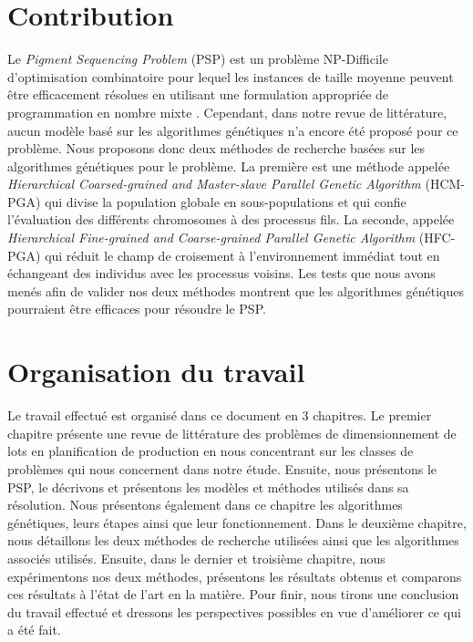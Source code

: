 	\section*{Contribution}
	Le \emph{Pigment Sequencing Problem} (PSP) est un problème NP-Difficile d'optimisation combinatoire pour lequel les instances de taille moyenne peuvent être efficacement résolues en utilisant une formulation appropriée de programmation en nombre mixte \cite{pochet_wolsey}. Cependant, dans notre revue de littérature, aucun modèle basé sur les algorithmes génétiques n'a encore été proposé pour ce problème. Nous proposons donc deux méthodes de recherche basées sur les algorithmes génétiques pour le problème. La première est une méthode appelée \emph{Hierarchical Coarsed-grained and Master-slave Parallel Genetic Algorithm} (HCM-PGA) qui divise la population globale en sous-populations et qui confie l'évaluation des différents chromosomes à des processus fils. La seconde, appelée \emph{Hierarchical Fine-grained and Coarse-grained Parallel Genetic Algorithm} (HFC-PGA) qui réduit le champ de croisement à l'environnement immédiat tout en échangeant des individus avec les processus voisins. Les tests que nous avons menés afin de valider nos deux méthodes montrent que les algorithmes génétiques pourraient être efficaces pour résoudre le PSP. 
	 
	\section*{Organisation du travail}

	Le travail effectué est organisé dans ce document en 3 chapitres. Le premier chapitre présente une revue de littérature des problèmes de dimensionnement de lots en planification de production en nous concentrant sur les classes de problèmes qui nous concernent dans notre étude. Ensuite, nous présentons le PSP, le décrivons et présentons les modèles et méthodes utilisés dans sa résolution. Nous présentons également dans ce chapitre les algorithmes génétiques, leurs étapes ainsi que leur fonctionnement. Dans le deuxième chapitre, nous détaillons les deux méthodes de recherche utilisées ainsi que les algorithmes associés utilisés. Ensuite, dans le dernier et troisième chapitre, nous expérimentons  nos deux méthodes, présentons les résultats obtenus et comparons ces résultats à l'état de l'art en la matière. Pour finir, nous tirons une conclusion du travail effectué et dressons les perspectives possibles en vue d'améliorer ce qui a été fait.